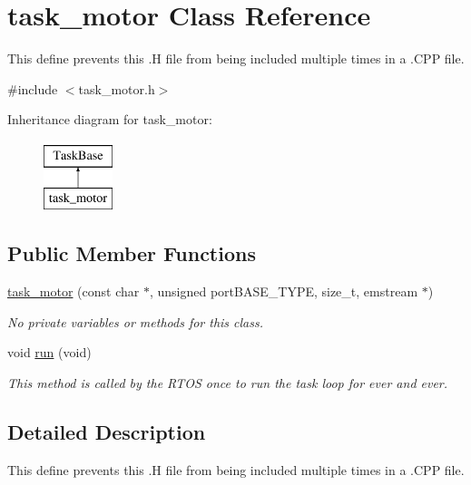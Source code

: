 \hypertarget{classtask__motor}{\section{task\-\_\-motor Class Reference}
\label{classtask__motor}
}


This define prevents this .H file from being included multiple times in a .C\-P\-P file.  




{\ttfamily \#include $<$task\-\_\-motor.\-h$>$}

Inheritance diagram for task\-\_\-motor\-:\begin{figure}[H]
\begin{center}
\leavevmode
\includegraphics[height=2.000000cm]{classtask__motor}
\end{center}
\end{figure}
\subsection*{Public Member Functions}
\begin{DoxyCompactItemize}
\item 
\hyperlink{classtask__motor_a6ed0a0b463e698d636b28bcdd518a027}{task\-\_\-motor} (const char $\ast$, unsigned port\-B\-A\-S\-E\-\_\-\-T\-Y\-P\-E, size\-\_\-t, emstream $\ast$)
\begin{DoxyCompactList}\small\item\em No private variables or methods for this class. \end{DoxyCompactList}\item 
void \hyperlink{classtask__motor_a895a075ec470c9d5a07b8959de06aacd}{run} (void)
\begin{DoxyCompactList}\small\item\em This method is called by the R\-T\-O\-S once to run the task loop for ever and ever. \end{DoxyCompactList}\end{DoxyCompactItemize}


\subsection{Detailed Description}
This define prevents this .H file from being included multiple times in a .C\-P\-P file. 

